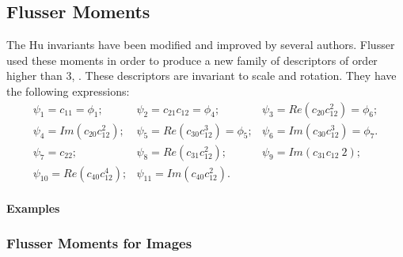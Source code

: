 \subsection{Flusser Moments}
\label{sec:FlusserMoments}
The Hu invariants have been modified and
improved by several authors. Flusser used these moments in order to
produce a new family of descriptors of order higher than 3,
\cite{flusserinv}. These descriptors are invariant to scale and
rotation. They have the following expressions:
\begin {equation}
\begin{array}{ccc}
\psi_1  = c_{11} = \phi_1; &  \psi_2  = c_{21}c_{12} = \phi_4; & \psi_3  = Re(c_{20}c_{12}^2) = \phi_6;\\
\psi_4  = Im(c_{20}c_{12}^2); & \psi_5  = Re(c_{30}c_{12}^3) = \phi_5;
& \psi_6  = Im(c_{30}c_{12}^3) = \phi_7.\\
\psi_7  = c_{22}; & \psi_8  = Re(c_{31}c_{12}^2); & \psi_9  = Im(c_{31}c_{12}~2);\\
\psi_{10} = Re(c_{40}c_{12}^4); & \psi_{11} = Im(c_{40}c_{12}^2). &\\

\end{array}
\end {equation}

\textbf{Examples}
\subsubsection{Flusser Moments for Images}

%



